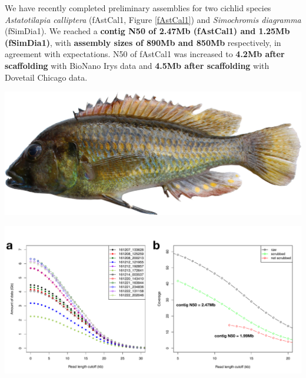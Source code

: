 \documentclass[a0,portrait]{a0poster}
\begin{document}
\begin{multicols}{2}
\noindent We have recently completed preliminary assemblies for two cichlid species \emph{Astatotilapia calliptera} (fAstCal1, Figure \ref{fAstCal1}) and \emph{Simochromis diagramma} (fSimDia1). We reached a \textbf{contig N50 of 2.47Mb (fAstCal1) and 1.25Mb (fSimDia1)}, with \textbf{assembly sizes of 890Mb and 850Mb} respectively, in agreement with expectations. N50 of fAstCal1 was increased to \textbf{4.2Mb after scaffolding} with BioNano Irys data and \textbf{4.5Mb after scaffolding} with Dovetail Chicago data.
\begin{center}
\captionsetup{type=figure}
\includegraphics[width=0.7\linewidth]{images/fAstCal1.png}
\label{fAstCal1}
\end{center}

\begin{center}
\captionsetup{type=figure}
\includegraphics[width=1.0\linewidth]{images/assemblies}
\end{center}

\vfill


\end{multicols}
\end{document}
